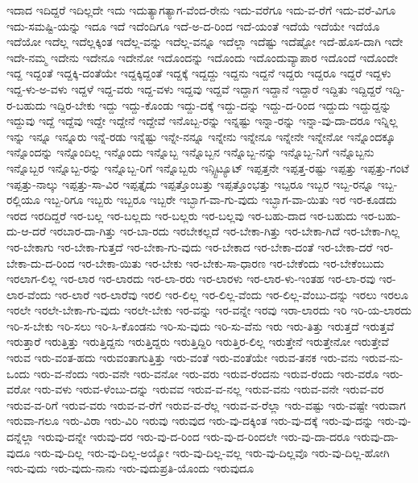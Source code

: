 {ಇದಾದ
ಇದಿದ್ದರೆ
ಇದಿಲ್ಲದೇ
ಇದು
ಇದುತ್ಯಾಗತ್ಯಾಗ-ವೆಂದ-ರೇನು
ಇದು-ವರೆಗೂ
ಇದು-ವ-ರೆಗೆ
ಇದು-ವರೆ-ವಿಗೂ
ಇದು-ಸಮಷ್ಟಿ-ಯನ್ನು
ಇದೂ
ಇದೆ
ಇದೆಂದಿಗೂ
ಇದೆ-ಅ-ದ-ರಿಂದ
ಇದೆ-ಯಂತೆ
ಇದೆಯೆ
ಇದೆಯೇ
ಇದೆಯೊ
ಇದೆಯೋ
ಇದೆಲ್ಲ
ಇದೆಲ್ಲಕ್ಕಿಂತ
ಇದೆಲ್ಲ-ವನ್ನು
ಇದೆಲ್ಲ-ವನ್ನೂ
ಇದೆಲ್ಲಾ
ಇದೆಷ್ಟು
ಇದೆಷ್ಟೋ
ಇದೆ-ಹೊಸ-ದಾಗಿ
ಇದೇ
ಇದೇ-ನಮ್ಮ
ಇದೇನು
ಇದೇನೂ
ಇದೇನೋ
ಇದೊಂದನ್ನು
ಇದೊಂದು
ಇದೊಂದುವ್ಯಾಪಾರ
ಇದೊಂದೆ
ಇದೊಂದೇ
ಇದ್ದ
ಇದ್ದಂತೆ
ಇದ್ದಕ್ಕಿ-ದಂತೆಯೇ
ಇದ್ದಕ್ಕಿದ್ದಂತೆ
ಇದ್ದಕ್ಕೆ
ಇದ್ದದ್ದು
ಇದ್ದನು
ಇದ್ದನೆ
ಇದ್ದರು
ಇದ್ದರೂ
ಇದ್ದರೆ
ಇದ್ದಳು
ಇದ್ದ-ಳು-ಅ-ವಳು
ಇದ್ದಳೆ
ಇದ್ದ-ವರು
ಇದ್ದ-ವಳು
ಇದ್ದವು
ಇದ್ದವೆ
ಇದ್ದಾಗ
ಇದ್ದಾನೆ
ಇದ್ದಾರೆ
ಇದ್ದಿತು
ಇದ್ದಿದ್ದರೆ
ಇದ್ದಿ-ರ-ಬಹುದು
ಇದ್ದಿರ-ಬೇಕು
ಇದ್ದು
ಇದ್ದು-ಕೊಂಡು
ಇದ್ದು-ದಕ್ಕೆ
ಇದ್ದು-ದನ್ನು
ಇದ್ದು-ದ-ರಿಂದ
ಇದ್ದುದು
ಇದ್ದುದ್ದನ್ನು
ಇದ್ದುವು
ಇದ್ದೆ
ಇದ್ದೆವು
ಇದ್ದೇ
ಇದ್ದೇನೆ
ಇದ್ದೇವೆ
ಇನೊಬ್ಬ-ರನ್ನು
ಇನ್ನಷ್ಟು
ಇನ್ನಾ-ರನ್ನು
ಇನ್ನಾ-ವು-ದಾ-ದರೂ
ಇನ್ನಿಲ್ಲ
ಇನ್ನು
ಇನ್ನೂ
ಇನ್ನೂರು
ಇನ್ನೆ-ರಡು
ಇನ್ನೆಷ್ಟು
ಇನ್ನೇ-ನನ್ನೂ
ಇನ್ನೇನು
ಇನ್ನೇನೂ
ಇನ್ನೇನೇ
ಇನ್ನೇನೋ
ಇನ್ನೊಂದಕ್ಕೂ
ಇನ್ನೊಂದನ್ನು
ಇನ್ನೊಂದಿಲ್ಲ
ಇನ್ನೊಂದು
ಇನ್ನೊಬ್ಬ
ಇನ್ನೊಬ್ಬನ
ಇನ್ನೊಬ್ಬ-ನನ್ನು
ಇನ್ನೊಬ್ಬ-ನಿಗೆ
ಇನ್ನೊಬ್ಬನು
ಇನ್ನೊಬ್ಬರ
ಇನ್ನೊಬ್ಬ-ರನ್ನು
ಇನ್ನೊಬ್ಬ-ರಿಗೆ
ಇನ್ನೊಬ್ಬರು
ಇನ್ಸ್ಟಿಟ್ಯೂಟ್
ಇಪ್ಪತ್ತನೇ
ಇಪ್ಪತ್ತ-ರಷ್ಟು
ಇಪ್ಪತ್ತು
ಇಪ್ಪತ್ತು-ಗಂಟೆ
ಇಪ್ಪತ್ತು-ನಾಲ್ಕು
ಇಪ್ಪತ್ತು-ಸಾ-ವಿರ
ಇಪ್ಪತ್ತೈದು
ಇಪ್ಪತ್ತೊಂಬತ್ತು
ಇಪ್ಪತ್ತೊಂಭತ್ತು
ಇಬ್ಪರೂ
ಇಬ್ಬರ
ಇಬ್ಬ-ರನ್ನೂ
ಇಬ್ಬ-ರಲ್ಲಿಯೂ
ಇಬ್ಬ-ರಿಗೂ
ಇಬ್ಬರು
ಇಬ್ಬರೂ
ಇಬ್ಬರೇ
ಇಬ್ಭಾಗ-ವಾ-ಗು-ವುದು
ಇಬ್ಭಾಗ-ವಾ-ಯಿತು
ಇರ
ಇರ-ಕೂಡದು
ಇರದ
ಇರದಿದ್ದರೆ
ಇರ-ಬಲ್ಲ
ಇರ-ಬಲ್ಲದು
ಇರ-ಬಲ್ಲರು
ಇರ-ಬಲ್ಲವು
ಇರ-ಬಹು-ದಾದ
ಇರ-ಬಹುದು
ಇರ-ಬಹು-ದು-ಆ-ದರೆ
ಇರಬಾರ-ದಾ-ಗಿತ್ತು
ಇರ-ಬಾ-ರದು
ಇರಬೇಕಲ್ಲದೆ
ಇರ-ಬೇಕಾ-ಗಿತ್ತು
ಇರ-ಬೇಕಾ-ಗಿದೆ
ಇರ-ಬೇಕಾ-ಗಿಲ್ಲ
ಇರ-ಬೇಕಾಗು
ಇರ-ಬೇಕಾ-ಗುತ್ತದೆ
ಇರ-ಬೇಕಾ-ಗು-ವುದು
ಇರ-ಬೇಕಾದ
ಇರ-ಬೇಕಾ-ದಂತೆ
ಇರ-ಬೇಕಾ-ದರೆ
ಇರ-ಬೇಕಾ-ದು-ದ-ರಿಂದ
ಇರ-ಬೇಕಾ-ಯಿತು
ಇರ-ಬೇಕು
ಇರ-ಬೇಕು-ಸಾ-ಧಾರಣ
ಇರ-ಬೇಕೆಂದು
ಇರ-ಬೇಕೆಂಬುದು
ಇರಲಾಗ-ಲಿಲ್ಲ
ಇರ-ಲಾರ
ಇರ-ಲಾರದು
ಇರ-ಲಾ-ರರು
ಇರ-ಲಾರಳು
ಇರ-ಲಾರ-ಳು-ಇಂತಹ
ಇರ-ಲಾ-ರವು
ಇರ-ಲಾರ-ವೆಂದು
ಇರ-ಲಾರೆ
ಇರ-ಲಾರೆವು
ಇರಲಿ
ಇರ-ಲಿಲ್ಲ
ಇರ-ಲಿಲ್ಲ-ವೆಂದು
ಇರ-ಲಿಲ್ಲ-ವೆಂಬು-ದನ್ನು
ಇರಲು
ಇರಲೂ
ಇರಲೇ
ಇರಲೇ-ಬೇಕಾ-ಗು-ವುದು
ಇರಲೇ-ಬೇಕು
ಇರ-ವನ್ನು
ಇರ-ವನ್ನೇ
ಇರವು
ಇರಾ-ಲಾರದು
ಇರಿ
ಇರಿ-ಯ-ಲಾರದು
ಇರಿ-ಸ-ಬೇಕು
ಇರಿ-ಸಲು
ಇರಿ-ಸಿ-ಕೊಂಡನು
ಇರಿ-ಸು-ವುದು
ಇರಿ-ಸು-ವೆನು
ಇರು
ಇರು-ತಿತ್ತು
ಇರುತ್ತದೆ
ಇರುತ್ತವೆ
ಇರುತ್ತಾರೆ
ಇರುತ್ತಿತ್ತು
ಇರುತ್ತಿದ್ದನು
ಇರುತ್ತಿದ್ದರು
ಇರುತ್ತಿದ್ದಿರಿ
ಇರುತ್ತಿರ-ಲಿಲ್ಲ
ಇರುತ್ತೇನೆ
ಇರುತ್ತೇನೋ
ಇರುತ್ತೇವೆ
ಇರುವ
ಇರು-ವಂತ-ಹದು
ಇರುವಂತಾಗುತ್ತಿತ್ತು
ಇರು-ವಂತೆ
ಇರು-ವಂತೆಯೇ
ಇರುವ-ತನಕ
ಇರು-ವನು
ಇರುವ-ನು-ಒಂದು
ಇರು-ವ-ನೆಂದು
ಇರು-ವನೇ
ಇರು-ವನೋ
ಇರು-ವರು
ಇರುವ-ರೆಂದನು
ಇರುವ-ರೆಂದು
ಇರು-ವರೊ
ಇರು-ವರೋ
ಇರು-ವಳು
ಇರುವ-ಳೆಂಬು-ದನ್ನು
ಇರುವವ
ಇರುವ-ವ-ನಲ್ಲ
ಇರುವ-ವನು
ಇರುವ-ವನೇ
ಇರುವ-ವರ
ಇರುವ-ವ-ರಿಗೆ
ಇರುವ-ವರು
ಇರುವ-ವ-ರೆಗೆ
ಇರುವ-ವ-ರೆಲ್ಲ
ಇರುವ-ವ-ರೆಲ್ಲಾ
ಇರು-ವಷ್ಟು
ಇರು-ವಷ್ಟೇ
ಇರುವಾಗ
ಇರುವಾ-ಗಲೂ
ಇರು-ವಿರಾ
ಇರು-ವಿರಿ
ಇರುವು
ಇರುವುದ
ಇರು-ವು-ದಕ್ಕಿಂತ
ಇರು-ವು-ದಕ್ಕೆ
ಇರು-ವು-ದನ್ನು
ಇರು-ವು-ದನ್ನೆಲ್ಲಾ
ಇರುವು-ದನ್ನೇ
ಇರುವು-ದರ
ಇರು-ವು-ದ-ರಿಂದ
ಇರು-ವು-ದ-ರಿಂದಲೇ
ಇರು-ವು-ದಾ-ದರೂ
ಇರುವು-ದಾ-ವುದೂ
ಇರು-ವು-ದಿಲ್ಲ
ಇರು-ವು-ದಿಲ್ಲ-ಅಯ್ಯೋ
ಇರು-ವು-ದಿಲ್ಲ-ವಲ್ಲ
ಇರು-ವು-ದಿಲ್ಲವೊ
ಇರು-ವು-ದಿಲ್ಲ-ಹೋಗಿ
ಇರು-ವುದು
ಇರು-ವುದು-ನಾನು
ಇರು-ವುದುಪ್ರತಿ-ಯೊಂದು
ಇರುವುದೂ
}
